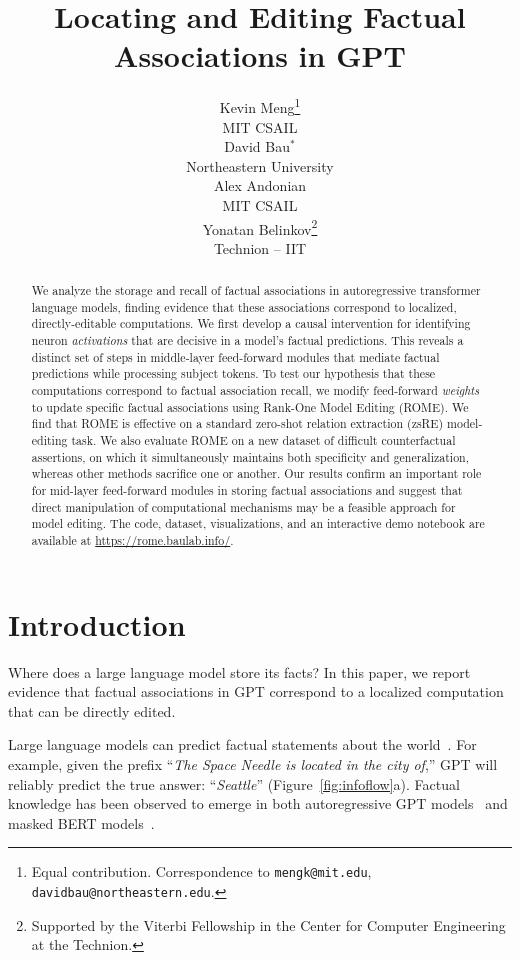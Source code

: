 \documentclass{article}
\title{Locating and Editing Factual Associations in GPT}
\author{%
Kevin Meng\thanks{Equal contribution. Correspondence to \texttt{mengk@mit.edu}, \texttt{davidbau@northeastern.edu}.} \\
MIT CSAIL \\
\And
David Bau$^*$ \\
Northeastern University \\
\And
Alex Andonian \\
MIT CSAIL \\
\And
Yonatan Belinkov\thanks{Supported by the Viterbi Fellowship in the Center for Computer Engineering at the Technion.} \\
Technion -- IIT \\
}
\newcommand{\reffig}[1]{Figure~\ref{fig:#1}}
\begin{document}
\maketitle

\addtolength{\tabcolsep}{-5pt}


\begin{abstract}
We analyze the storage and recall of factual associations in autoregressive transformer language models, finding evidence that these associations correspond to localized, directly-editable computations. We first develop a causal intervention for identifying neuron \textit{activations} that are decisive in a model's factual predictions. This reveals a distinct set of steps in middle-layer feed-forward modules that mediate factual predictions while processing subject tokens. To test our hypothesis that these computations correspond to factual association recall, we modify feed-forward \textit{weights} to update specific factual associations using Rank-One Model Editing (ROME).  We find that ROME is effective on a standard zero-shot relation extraction (zsRE) model-editing task. We also evaluate ROME on a new dataset of difficult counterfactual assertions, on which it simultaneously maintains both specificity and generalization, whereas other methods sacrifice one or another. Our results confirm an important role for mid-layer feed-forward modules in storing factual associations and suggest that direct manipulation of computational mechanisms may be a feasible approach for model editing. The code, dataset, visualizations, and an interactive demo notebook are available
at \url{https://rome.baulab.info/}.


\end{abstract}


\section{Introduction}

Where does a large language model store its facts? In this paper, we report evidence that factual associations in GPT correspond to a localized computation that can be directly edited.


Large language models can predict factual statements about the world~\citep{petroni-etal-2019-language,jiang-etal-2020-know,roberts-etal-2020-much}. For example, given the prefix ``\emph{The Space Needle is located in the city of},'' GPT will reliably predict the true answer: ``\emph{Seattle}'' (\reffig{infoflow}a).  Factual knowledge has been observed to emerge in both autoregressive GPT models~\citep{gpt2,gpt3} and masked BERT models~\citep{devlin-etal-2019-bert}.
\end{document}

